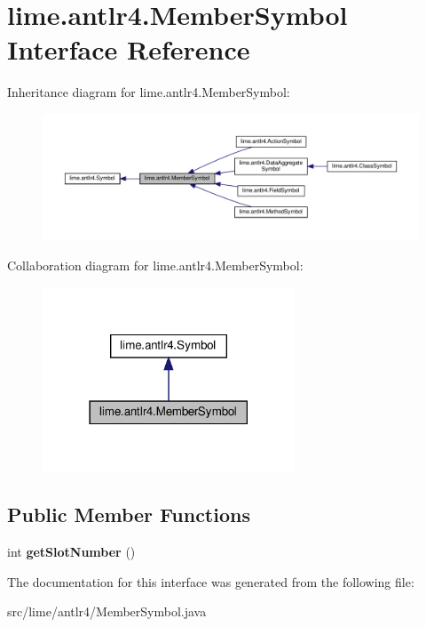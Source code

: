 \hypertarget{interfacelime_1_1antlr4_1_1MemberSymbol}{}\section{lime.\+antlr4.\+Member\+Symbol Interface Reference}
\label{interfacelime_1_1antlr4_1_1MemberSymbol}


Inheritance diagram for lime.\+antlr4.\+Member\+Symbol\+:
\nopagebreak
\begin{figure}[H]
\begin{center}
\leavevmode
\includegraphics[width=350pt]{interfacelime_1_1antlr4_1_1MemberSymbol__inherit__graph}
\end{center}
\end{figure}


Collaboration diagram for lime.\+antlr4.\+Member\+Symbol\+:
\nopagebreak
\begin{figure}[H]
\begin{center}
\leavevmode
\includegraphics[width=213pt]{interfacelime_1_1antlr4_1_1MemberSymbol__coll__graph}
\end{center}
\end{figure}
\subsection*{Public Member Functions}
\begin{DoxyCompactItemize}
\item 
\mbox{\label{interfacelime_1_1antlr4_1_1MemberSymbol_a0dd554e51511eed1a98745df9815eb40}} 
int {\bfseries get\+Slot\+Number} ()
\end{DoxyCompactItemize}


The documentation for this interface was generated from the following file\+:\begin{DoxyCompactItemize}
\item 
src/lime/antlr4/Member\+Symbol.\+java\end{DoxyCompactItemize}
